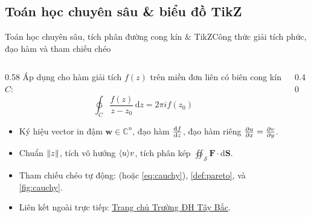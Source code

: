 \documentclass[aspectratio=43,10pt]{beamer}
\begin{document}
\subsection{Toán học chuyên sâu \& biểu đồ TikZ}
\begin{frame}{Toán học chuyên sâu, tích phân đường cong kín \& TikZ}{Công thức giải tích phức, đạo hàm và tham chiếu chéo}
  \small
  \begin{columns}[c]
    \begin{column}{0.58\textwidth}
      Áp dụng cho hàm giải tích $f(z)$ trên miền đơn liên có biên cong kín $C$:
      \begin{equation}
        \ointctrclockwise_{C} \frac{f(z)}{z - z_0}\,\mathrm{d}z = 2\pi i f(z_0) \label{eq:cauchy}
      \end{equation}
      \begin{itemize}\setlength{\itemsep}{2pt}
        \item Ký hiệu vector in đậm $\bm{w} \in \mathbb{C}^n$, đạo hàm $\odv{f}{z}$, đạo hàm riêng $\pdv{u}{x} = \pdv{v}{y}$.
        \item Chuẩn $\lVert z\rVert$, tích vô hướng $\langle u\rangle{v}$, tích phân kép $\oiint_{\mathcal{S}} \bm{F}\cdot\mathrm{d}\bm{S}$.
        \item Tham chiếu chéo tự động:  (hoặc \eqref{eq:cauchy}), \cref{def:pareto}, và \cref{fig:cauchy}.
        \item Liên kết ngoài trực tiếp: \href{https://utb.edu.vn}{\underline{Trang chủ Trường ĐH Tây Bắc}}.
      \end{itemize}
    \end{column}
    \begin{column}{0.40\textwidth}
      \centering
      \vskip 2pt
      \label{fig:cauchy}
    \end{column}
  \end{columns}
\end{frame}
\end{document}
